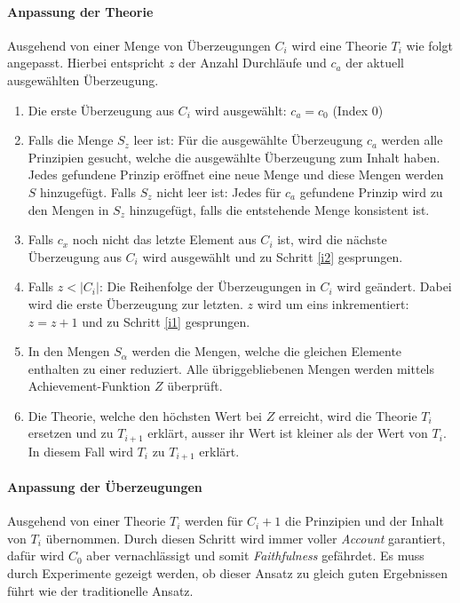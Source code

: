 \documentclass{article}
\begin{document}
\paragraph{Anpassung der Theorie}
Ausgehend von einer Menge von Überzeugungen $C_i$ wird eine Theorie $T_i$ wie folgt angepasst. Hierbei entspricht $z$ der Anzahl Durchläufe und $c_a$ der aktuell ausgewählten Überzeugung. 
\begin{enumerate}
    \item \label{i1} Die erste Überzeugung aus $C_i$ wird ausgewählt: $c_a = c_0$ (Index 0)
    \item \label{i2} Falls die Menge $S_z$ leer ist: Für die ausgewählte Überzeugung $c_a$ werden alle Prinzipien gesucht, welche die ausgewählte Überzeugung zum Inhalt haben. Jedes gefundene Prinzip eröffnet eine neue Menge und diese Mengen werden $S$ hinzugefügt. Falls $S_z$ nicht leer ist: Jedes für $c_a$ gefundene Prinzip wird zu den Mengen in $S_z$ hinzugefügt, falls die entstehende Menge konsistent ist.
    \item \label{i3} Falls $c_x$ noch nicht das letzte Element aus $C_i$ ist, wird die nächste Überzeugung aus $C_i$ wird ausgewählt und zu Schritt \ref{i2} gesprungen.
    \item \label{i4} Falls $z < \lvert C_i \rvert$: Die Reihenfolge der Überzeugungen in $C_i$ wird geändert. Dabei wird die erste Überzeugung zur letzten. $z$ wird um eins inkrementiert: $z = z + 1$ und zu Schritt \ref{i1} gesprungen.
    \item \label{i5} In den Mengen $S_\alpha$ werden die Mengen, welche die gleichen Elemente enthalten zu einer reduziert. Alle übriggebliebenen Mengen werden mittels Achievement-Funktion $Z$ überprüft.
    \item \label{i6}Die Theorie, welche den höchsten Wert bei $Z$ erreicht, wird die Theorie $T_i$ ersetzen und zu $T_{i+1}$ erklärt, ausser ihr Wert ist kleiner als der Wert von $T_i$. In diesem Fall wird $T_i$ zu $T_{i+1}$ erklärt.
\end{enumerate}

\paragraph{Anpassung der Überzeugungen}
Ausgehend von einer Theorie $T_i$ werden für $C_i+1$ die Prinzipien und der Inhalt von $T_i$ übernommen.
Durch diesen Schritt wird immer voller \textit{Account} garantiert, dafür wird $C_0$ aber vernachlässigt und somit \textit{Faithfulness} gefährdet. Es muss durch Experimente gezeigt werden, ob dieser Ansatz zu gleich guten Ergebnissen führt wie der traditionelle Ansatz.

\newpage
\printbibliography
\end{document}
